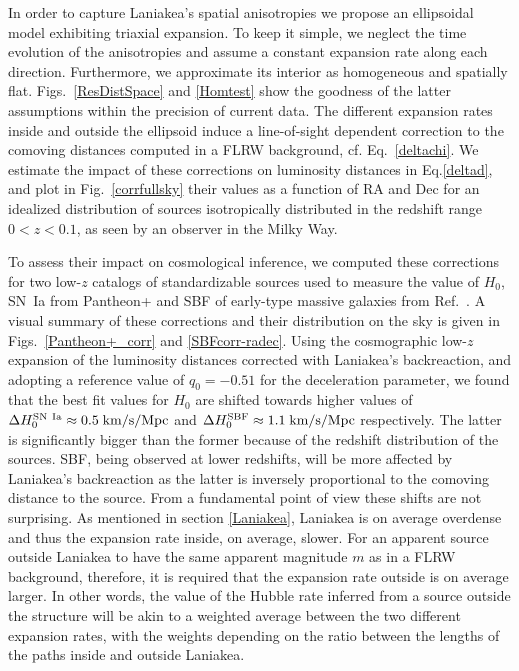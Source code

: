 \documentclass[notitlepage,nofootinbib]{revtex4-1}
\begin{document}
In order to capture Laniakea's spatial anisotropies we propose an ellipsoidal model exhibiting triaxial expansion. To keep it simple, we neglect the time evolution of the anisotropies and assume a constant expansion rate along each direction. Furthermore, we approximate its interior as homogeneous and spatially flat. Figs.~\ref{ResDistSpace} and \ref{Homtest} show the goodness of the latter assumptions within the precision of current data. The different expansion rates inside and outside the ellipsoid induce a line-of-sight dependent correction to the comoving distances computed in a FLRW background, cf. Eq.~\eqref{deltachi}. We estimate the impact of these corrections on luminosity distances in Eq.\eqref{deltad}, and plot in Fig.~\ref{corrfullsky} their values as a function of RA and Dec for an idealized distribution of sources isotropically distributed in the redshift range $0< z< 0.1$, as seen by an observer in the Milky Way. 

To assess their impact on cosmological inference, we computed these corrections for two low-$z$ catalogs of standardizable sources used to measure the value of $H_0$, SN~Ia from Pantheon+ \cite{Scolnic:2021amr,Riess:2021jrx} and SBF of early-type massive galaxies from Ref.~\cite{2021ApJS..255...21J}. A visual summary of these corrections and their distribution on the sky is given in Figs.~\ref{Pantheon+_corr} and \ref{SBFcorr-radec}. Using the cosmographic low-$z$ expansion of the luminosity distances \cite{Visser:2004bf} corrected with Laniakea's backreaction, and adopting a reference value of $q_0=-0.51$ for the deceleration parameter, we found that the best fit values for $H_0$ are shifted towards higher values of $\Delta H_0^{\rm{SN~Ia}}\approx 0.5 \;\rm{km}/\rm{s}/\rm{Mpc}$ and $\Delta H_0^{\rm{SBF}}\approx 1.1 \;\rm{km}/\rm{s}/\rm{Mpc}$ respectively. The latter is significantly bigger than the former because of the redshift distribution of the sources. SBF, being observed at lower redshifts, will be more affected by Laniakea's backreaction as the latter is inversely proportional to the comoving distance to the source.
From a fundamental point of view these shifts are not surprising. As mentioned in section \ref{Laniakea}, Laniakea is on average overdense and thus the expansion rate inside, on average, slower. For an apparent source outside Laniakea to have the same apparent magnitude $m$ as in a FLRW background, therefore, it is required that the expansion rate outside is on average larger. In other words, the value of the Hubble rate inferred from a source outside the structure will be akin to a weighted average between the two different expansion rates, with the weights depending on the ratio between the lengths of the paths inside and outside Laniakea.  
\end{document}

